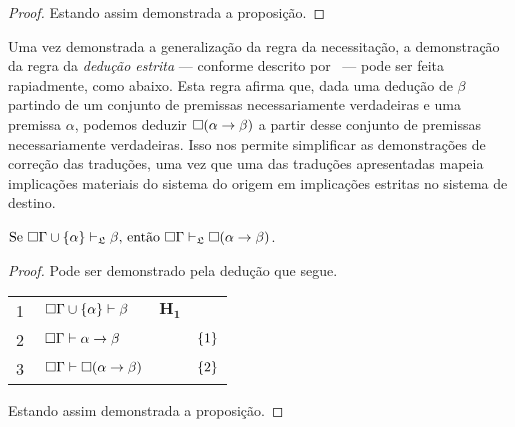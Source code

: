 \begin{tcolorbox}[enhanced jigsaw, breakable, sharp corners, colframe=black, colback=white, boxrule=0.5pt, left=1.5mm, right=1.5mm, top=1.5mm, bottom=1.5mm]
\begin{theorem}
\begin{proof}
            \vspace{0.5\baselineskip}
            Estando assim demonstrada a proposição.
        \end{proof}
    \end{theorem}
    \end{tcolorbox}

    \vspace{.5\baselineskip}
    Uma vez demonstrada a generalização da regra da necessitação, a demonstração da regra da \emph{dedução estrita} --- conforme descrito por~\cite{Barcan, Marcus} --- pode ser feita rapiadmente, como abaixo.
    Esta regra afirma que, dada uma dedução de $\beta$ partindo de um conjunto de premissas necessariamente verdadeiras e uma premissa $\alpha$, podemos deduzir $\Box(\alpha\to\beta)$ a partir desse conjunto de premissas necessariamente verdadeiras.
    Isso nos permite simplificar as demonstrações de correção das traduções, uma vez que uma das traduções apresentadas mapeia implicações materiais do sistema do origem em implicações estritas no sistema de destino.

    \vspace{\baselineskip}
    \begin{tcolorbox}[enhanced jigsaw, breakable, sharp corners, colframe=black, colback=white, boxrule=0.5pt, left=1.5mm, right=1.5mm, top=1.5mm, bottom=1.5mm]
    \begin{lemma}\label{strict.deduction}
        $\text{Se }\Box\Gamma\cup\left\{\alpha\right\}\mathrel{\vdash}_{\mathfrak{L}}\beta\text{, então }\Box\Gamma\mathrel{\vdash}_{\mathfrak{L}}\Box(\alpha\to\beta)$.
        \begin{proof}
            Pode ser demonstrado pela dedução que segue.

            \vspace{0.5\baselineskip}
            \footnotesize
            \setlength{\rowskip}{0.5\baselineskip}
            \begin{xltabular}{\textwidth}{r | X l l}
                \scriptsize{\phantom{0}1}\phantom{ } & $\ \nec\Gamma\cup\set{\alpha}\entails\beta$ & $\mathbf{H_1}$\phantom{1} & \\[\rowskip]
                \scriptsize{\phantom{0}2}\phantom{ } & $\ \nec\Gamma\entails\alpha\to\beta$        &       & $\left\{1\right\}$\\[\rowskip]
                \scriptsize{\phantom{0}3}\phantom{ } & $\ \nec\Gamma\entails\nec(\alpha\to\beta)$  &  & $\left\{2\right\}$
            \end{xltabular}
            \normalsize

            \vspace{0.5\baselineskip}
            Estando assim demonstrada a proposição.
        \end{proof}
    \end{lemma}
    \end{tcolorbox}

